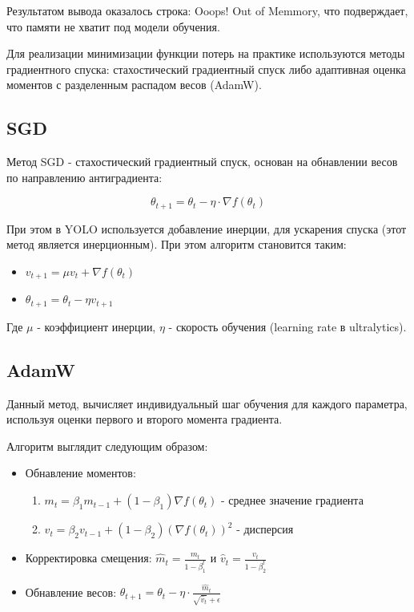 \documentclass[areasetadvanced]{scrartcl}
\begin{document}
Результатом вывода оказалось строка: \guillemetleft Ooops! Out of Memmory\guillemetright, 
что подверждает, что памяти не хватит под модели обучения. 

Для реализации минимизации функции потерь на практике используются методы градиентного спуска: стахостический градиентный спуск либо адаптивная оценка моментов с разделенным распадом весов (AdamW).

\subsection{SGD}
Метод SGD - стахостический градиентный спуск, основан на обнавлении весов по направлению антиградиента:

$$
    \theta_{t+1} = \theta_t - \eta \cdot \nabla f(\theta_t)
$$

При этом в YOLO используется добавление инерции, для ускарения спуска (этот метод является инерционным). При этом алгоритм становится таким:

\begin{itemize}
    \item $v_{t+1} = \mu v_t + \nabla f(\theta_t)$
    \item $\theta_{t+1} = \theta_t - \eta v_{t+1}$
\end{itemize}

Где $\mu$ - коэффициент инерции, $\eta$ - скорость обучения (learning rate в ultralytics).

\subsection{AdamW}

Данный метод, вычисляет индивидуальный шаг обучения для каждого параметра, используя оценки первого и второго момента градиента.

Алгоритм выглядит следующим образом:
\begin{itemize}
    \item Обнавление моментов: \begin{enumerate} 
        \item $m_t = \beta_1 m_{t-1} + (1 - \beta_1) \nabla f(\theta_t)$ - среднее значение градиента
        \item $v_t = \beta_2 v_{t-1} + (1 - \beta_2)(\nabla f(\theta_t))^2$ - дисперсия
    \end{enumerate}
    \item Корректировка смещения: $\hat{m}_t = \frac{m_t}{1 - \beta_1^t}$ и $\hat{v}_t = \frac{v_t}{1 - \beta_2^t}$
    \item Обнавление весов: $\theta_{t+1} = \theta_t - \eta \cdot \frac{\hat{m}_t}{\sqrt{\hat{v}_t} + \epsilon}$
\end{itemize}
\end{document}
